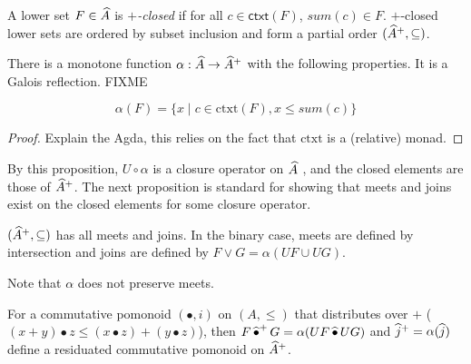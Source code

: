 \begin{definition}
  A lower set $F \in \widehat{A}$ is \emph{$+$-closed} if for all
  $c \in \mathsf{ctxt}(F)$, $\mathit{sum}(c) \in F$. $+$-closed lower
  sets are ordered by subset inclusion and form a partial order
  $(\widehat{A}^+, \subseteq)$.
\end{definition}

\begin{proposition}
  There is a monotone function
  $\alpha : \widehat{A} \to \widehat{A}^+$ with the following
  properties. It is a Galois reflection. FIXME

  \begin{displaymath}
    \alpha(F) = \{ x \mid c \in \mathrm{ctxt}(F), x \leq \mathit{sum}(c) \}
  \end{displaymath}
\end{proposition}

\begin{proof}
  Explain the Agda, this relies on the fact that $\mathrm{ctxt}$ is a
  (relative) monad.
\end{proof}

\begin{remark}
  By this proposition, $U \circ \alpha$ is a closure operator on
  $\widehat{A}$ \cite{davey-priestley}, and the closed elements are
  those of $\widehat{A}^+$. The next proposition is standard for
  showing that meets and joins exist on the closed elements for some
  closure operator.
\end{remark}

\begin{proposition}
  $(\widehat{A}^+, \subseteq)$ has all meets and joins. In the
  binary case, meets are defined by intersection and joins are defined
  by $F \lor G = \alpha (U F \cup U G)$.
\end{proposition}

\begin{remark}
  Note that $\alpha$ does not preserve meets.
\end{remark}

\begin{proposition}\label{prop:closed-monoid-distrib}
  For a commutative pomonoid $(\bullet, i)$ on $(A, \leq)$ that
  distributes over $+$
  ($(x + y) \bullet z \leq (x \bullet z) + (y \bullet z)$), then
  $F \mathop{\widehat{\bullet}^+} G = \alpha(U F \mathop{\widehat{\bullet}} U G)$ and
  $\mathop{\widehat{j}^+} = \alpha(\mathop{\widehat{j}})$ define a residuated commutative
  pomonoid on $\widehat{A}^+$.
\end{proposition}

